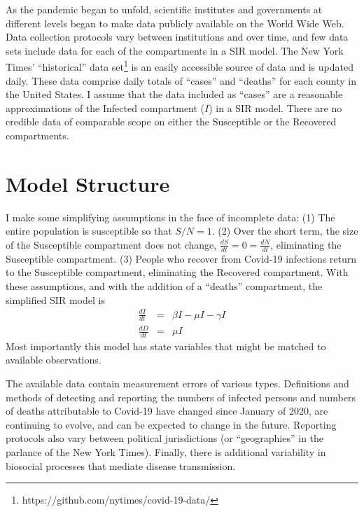 \documentclass[12pt,letterpaper]{article}
\begin{document}

As the pandemic began to unfold, scientific institutes and governments
at different levels began to make data publicly available on the
World Wide Web.
Data collection protocols vary between institutions and over time, 
and few data sets include data for each of
the compartments in a SIR model. 
The New York Times' ``historical'' 
data set\footnote{\label{ff:nyt}https://github.com/nytimes/covid-19-data/}
is an easily accessible source of data and is updated daily. These data
comprise daily totals of ``cases'' and ``deaths'' for each county
in the United States. I assume that the data included as ``cases'' are
a reasonable approximations of the Infected compartment ($I$) in a SIR
model. There are no credible data of comparable scope on
either the Susceptible or the Recovered compartments.

\section*{Model Structure}
I make some simplifying assumptions in the face of incomplete data: 
(1) The entire population is susceptible so that $S/N = 1$. 
(2) Over the short term, the size of the
Susceptible compartment does not change, 
$\frac{dS}{dt} = 0 = \frac{dN}{dt}$,
eliminating the Susceptible compartment.
(3) People who recover from Covid-19 infections return to the Susceptible
compartment, eliminating the Recovered compartment. 
With these assumptions, and with the addition of a ``deaths''
compartment, the simplified SIR model is
\begin{eqnarray}
\label{eqn:sSIRI}
\frac{dI}{dt} &=&  \beta I - \mu I -\gamma I\\
\label{eqn:sSIRD}
\frac{dD}{dt} &=& \mu I
\end{eqnarray}
Most importantly this model
has state variables that might be matched to available observations.

The available data contain measurement errors of various types.
Definitions and methods of detecting and reporting the numbers of
infected persons and numbers of deaths attributable to Covid-19 have
changed since January of 2020, are continuing to evolve, and can be
expected to change in the future.
Reporting protocols also vary between political jurisdictions (or
``geographies'' in the parlance of the New York Times).
Finally, there is additional variability in biosocial
processes that mediate disease transmission.
\end{document}

